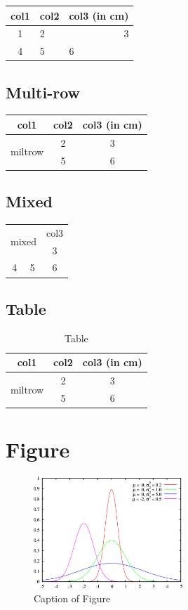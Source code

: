 \documentclass{article}
\begin{document}
\begin{tabular}{|c|l|p{1cm}|}
\hline
col1 & col2 & col3 (in cm) \\
\hline
1 & 2 & \multicolumn{1}{|r|}{3}\\
\hline
4 & 5 & 6 \\
\hline
\end{tabular}

\subsection{Multi-row}
\begin{tabular}{|c|c|c|}
\hline
col1 & col2 & col3 (in cm) \\
\hline
\multirow{2}{*}{miltrow} & 2 & 3\\
\cline{2-3}
 & 5 & 6 \\
\hline
\end{tabular}

\subsection{Mixed}
\begin{tabular}{|cc|c|}
\hline
\multicolumn{2}{|c|}{\multirow{2}{*}{mixed}} & col3 \\
\cline{3-3}
 &  & 3\\
\hline
4 & 5 & 6 \\
\hline
\end{tabular}

\subsection{Table}
\begin{table}[h!]
    \centering
    \begin{tabular}{|c|c|c|}
    \hline
    col1 & col2 & col3 (in cm) \\
    \hline
    \multirow{2}{*}{miltrow} & 2 & 3\\
    \cline{2-3}
     & 5 & 6 \\
    \hline
    \end{tabular}
    \caption{Table}
    \label{tab:my_label}
\end{table}

\section{Figure}
\begin{figure}[p]
    \centering
    \includegraphics[width=0.5\textwidth]{Normal_distribution.png}
    \caption{Caption of Figure}
    \label{fig:my_label}
\end{figure}
\end{document}
